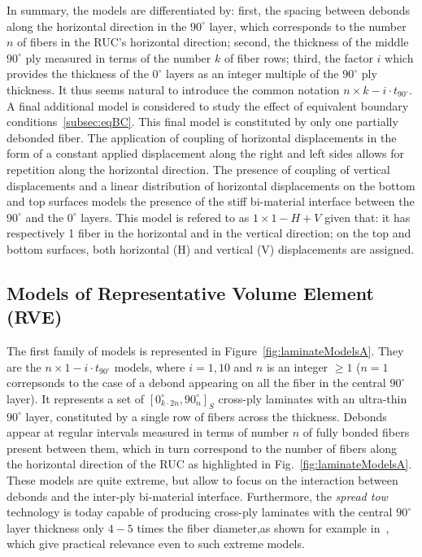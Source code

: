 \documentclass[review]{elsarticle}
\begin{document}
In summary, the models are differentiated by: first, the spacing between debonds along the horizontal direction in the $90^{\circ}$ layer, which corresponds to the number $n$ of fibers in the RUC's horizontal direction; second, the thickness of the middle $90^{\circ}$ ply measured in terms of the number $k$ of fiber rows; third, the factor $i$ which provides the thickness of the $0^{\circ}$ layers as an integer multiple of the $90^{\circ}$ ply thickness.  It thus seems natural to introduce the common notation $n\times k-i\cdot t_{90^{\circ}}$. A final additional model is considered to study the effect of equivalent boundary conditions~\ref{subsec:eqBC}. This final model is constituted by only one partially debonded fiber. The application of coupling of horizontal displacements in the form of a constant applied displacement along the right and left sides allows for repetition along the horizontal direction. The presence of coupling of vertical displacements and a linear distribution of horizontal displacements on the bottom and top surfaces models the presence of the stiff bi-material interface between the $90^{\circ}$ and the $0^{\circ}$ layers. This model is refered to as $1\times 1-H+V$ given that: it has respectively 1 fiber in the horizontal and in the vertical direction; on the top and bottom surfaces, both horizontal (H) and vertical (V) displacements are assigned.  


\subsection{Models of Representative Volume Element (RVE)}\label{subsec:rve}

The first family of models is represented in Figure~\ref{fig:laminateModelsA}. They are the $n\times1-i\cdot t_{90^{\circ}}$ models, where $i=1,10$ and $n$ is an integer $\geq1$ ($n=1$ correpsonds to the case of a debond appearing on all the fiber in the central $90^{\circ}$ layer). It represents a set of $\left[0_{k\cdot2n}^{\circ},90_{n}^{\circ}\right]_{S}$ cross-ply laminates with an ultra-thin $90^{\circ}$ layer, constituted by a single row of fibers across the thickness. Debonds appear at regular intervals measured in terms of number $n$ of fully bonded fibers present between them, which in turn correspond to the number of fibers along the horizontal direction of the RUC as highlighted in Fig.~\ref{fig:laminateModelsA}. These models are quite extreme, but allow to focus on the interaction between debonds and the inter-ply bi-material interface. Furthermore, the \emph{spread tow} technology is today capable of producing cross-ply laminates with the central $90^{\circ}$ layer thickness only $4-5$ times the fiber diameter,as shown for example in~\cite{Saito2012}, which give practical relevance even to such extreme models.  
\end{document}
